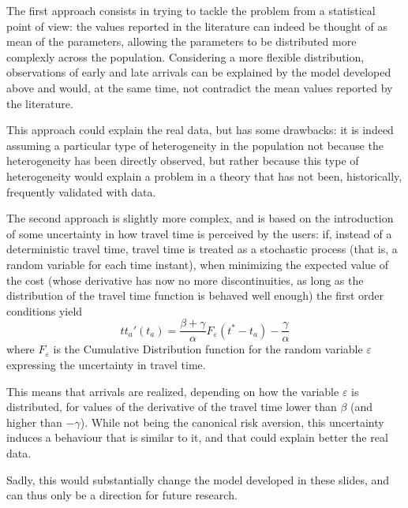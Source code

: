 The first approach consists in trying to tackle the problem from a statistical point of view:
the values reported in the literature can indeed be thought of as mean of the parameters,
allowing the parameters to be distributed more complexly across the population.
Considering a more flexible distribution,
observations of early and late arrivals can be explained by the model developed above and would,
at the same time,
not contradict the mean values reported by the literature.

This approach could explain the real data, but has some drawbacks:
it is indeed assuming a particular type of heterogeneity in the population not because the heterogeneity has been directly observed,
but rather because this type of heterogeneity would explain a problem in a theory that has not been,
historically,
frequently validated with data.

The second approach is slightly more complex, and is based on the introduction of some uncertainty in how travel time is perceived by the users:
if, instead of a deterministic travel time,
travel time is treated as a stochastic process (that is, a random variable for each time instant),
when minimizing the expected value of the cost (whose derivative has now no more discontinuities, as long as the distribution of the travel time function is behaved well enough)
the first order conditions yield
\begin{equation*}
  tt_a'(t_a) = \frac{\beta + \gamma}{\alpha}F_\varepsilon(t^* - t_a) - \frac{\gamma}{\alpha}
\end{equation*}
where \(F_\varepsilon\) is the Cumulative Distribution function for the random variable \(\varepsilon\) expressing the uncertainty in travel time.

This means that arrivals are realized, depending on how the variable \(\varepsilon\) is distributed,
for values of the derivative of the travel time lower than \(\beta\) (and higher than \(-\gamma\)).
While not being the canonical risk aversion,
this uncertainty induces a behaviour that is similar to it,
and that could explain better the real data.

Sadly, this would substantially change the model developed in these slides,
and can thus only be a direction for future research.

